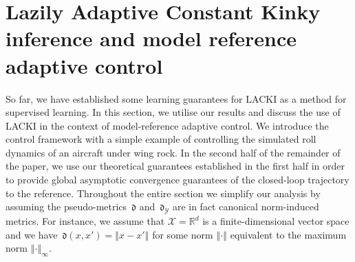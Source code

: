 \documentclass{article} %
\theoremstyle{definition}
\theoremstyle{remark}
\newcommand{\norm}[1]{\left\Vert#1\right\Vert}
\newcommand{\abs}[1]{\left\vert#1\right\vert}
\newcommand{\Real}{\mathbb R}
\newcommand{\data}{\ensuremath{ \mathcal D} }
\newcommand{\inspace}{\ensuremath{ \mathcal X}}
\newcommand{\outspace}{\ensuremath{ \mathcal Y}}
\newcommand{\metric}{\, \mathfrak{d}} %
\newcommand{\hestthresh}{\ensuremath{ \lambda}}
\begin{document}
%
%

%
\section{Lazily Adaptive Constant Kinky inference and model reference adaptive control}
\label{sec:MRAC_lacki}
So far, we have established some learning guarantees for LACKI as a method for supervised learning. In this section, we utilise our results and discuss the use of LACKI in the context of model-reference adaptive control. We introduce the control framework with a simple example of controlling the simulated roll dynamics of an aircraft under wing rock. In the second half of the remainder of the paper, we use our theoretical guarantees established in the first half in order to provide global asymptotic convergence guarantees of the closed-loop trajectory to the reference. 
Throughout the entire section we simplify our analysis by assuming the pseudo-metrics $\metric$ and $\metric_\outspace$ are in fact canonical norm-induced metrics. For instance, we assume that $\inspace = \Real^d$ is a finite-dimensional vector space and we have $\metric(x,x') =\norm{x-x'}$ for some norm $\norm{\cdot}$ equivalent to the maximum norm $\norm{\cdot}_\infty$.
\end{document}
